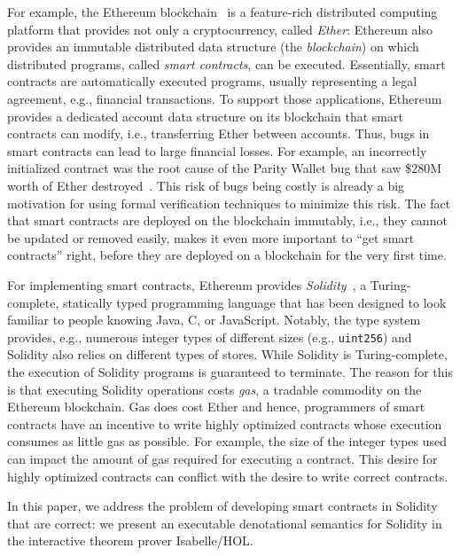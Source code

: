 \documentclass[10pt,DIV17,a4paper,abstract=true,twoside=semi,openright]
{scrreprt}
\begin{document}
For example, the Ethereum blockchain~\cite{Wood2014} is a feature-rich
distributed computing platform that provides not only a cryptocurrency, called
\emph{Ether}: Ethereum also provides an immutable distributed data structure
(the \emph{blockchain}) on which distributed programs, called \emph{smart
contracts}, can be executed. Essentially, smart contracts are automatically
executed programs, usually representing a legal agreement, e.g., financial
transactions. To support those applications, Ethereum provides a dedicated
account data structure on its blockchain that smart contracts can modify, i.e.,
transferring Ether between accounts. Thus, bugs in smart contracts can lead to
large financial losses.  For example, an incorrectly initialized contract was
the root cause of the Parity Wallet bug that saw \$280M worth of Ether
destroyed~\cite{perez.ea:smart:2021}. This risk of bugs being costly is already
a big motivation for using formal verification techniques to minimize this risk.
The fact that smart contracts are deployed on the blockchain immutably, i.e.,
they cannot be updated or removed easily, makes it even more important to ``get
smart contracts'' right, before they are deployed on a blockchain for the very
first time. 

For implementing smart contracts, Ethereum provides
\emph{Solidity}~\cite{Solidity}, a Turing-complete, statically typed programming
language that has been designed to look familiar to people knowing Java, C, or
JavaScript.  Notably, the type system provides, e.g., numerous integer types of
different sizes (e.g., \texttt{uint256}) and Solidity also relies on different
types of stores. While Solidity is Turing-complete, the execution of Solidity
programs is guaranteed to terminate. The reason for this is that executing
Solidity operations costs \emph{gas}, a tradable commodity on the Ethereum
blockchain. Gas does cost Ether and hence, programmers of smart contracts have
an incentive to write highly optimized contracts whose execution consumes as
little gas as possible. For example, the size of the integer types used can
impact the amount of gas required for executing a contract.  This desire for
highly optimized contracts can conflict with the desire to write correct
contracts.

In this paper, we address the problem of developing smart contracts in Solidity
that are correct: we present an executable denotational semantics for Solidity
in the interactive theorem prover Isabelle/HOL.
\end{document}
